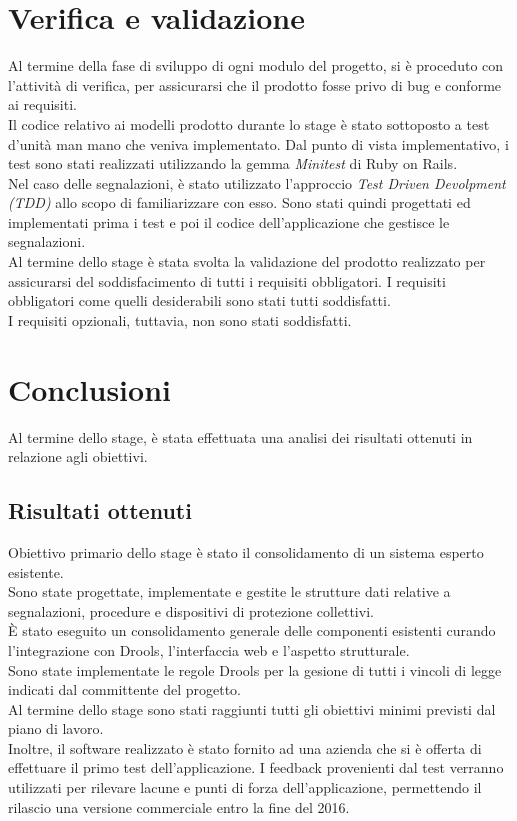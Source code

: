\newpage
\section{Verifica e validazione}
	Al termine della fase di sviluppo di ogni modulo del progetto, si è proceduto con l'attività di verifica, per assicurarsi che il prodotto fosse privo di bug e conforme ai requisiti.\\
	Il codice relativo ai modelli prodotto durante lo stage è stato sottoposto a test d'unità man mano che veniva implementato. Dal punto di vista implementativo, i test sono stati realizzati utilizzando la gemma \textit{Minitest} di Ruby on Rails.\\
	Nel caso delle segnalazioni, è stato utilizzato l'approccio \textit{Test Driven Devolpment (TDD)} allo scopo di familiarizzare con esso. Sono stati quindi progettati ed implementati prima i test e poi il codice dell'applicazione che gestisce le segnalazioni.\\
	Al termine dello stage è stata svolta la validazione del prodotto realizzato per assicurarsi del soddisfacimento di tutti i requisiti obbligatori. I requisiti obbligatori come quelli desiderabili sono stati tutti soddisfatti.\\
	I requisiti opzionali, tuttavia,  non sono stati soddisfatti. 
	
	
	
\newpage
\section{Conclusioni}

	Al termine dello stage, è stata effettuata una analisi dei risultati ottenuti in relazione agli obiettivi.
	
	\subsection{Risultati ottenuti}

		Obiettivo primario dello stage è stato il consolidamento di un sistema esperto esistente. \\
		Sono state progettate, implementate e gestite le strutture dati relative a segnalazioni, procedure e dispositivi di protezione collettivi. \\
		È stato eseguito un consolidamento generale delle componenti esistenti curando l'integrazione con Drools, l'interfaccia web e l'aspetto strutturale.\\
		Sono state implementate le regole Drools per la gesione di tutti i vincoli di legge indicati dal committente del progetto.\\
		Al termine dello stage sono stati raggiunti tutti gli obiettivi minimi previsti dal piano di lavoro.\\
		Inoltre, il software realizzato è stato fornito ad una azienda che si è offerta di effettuare il primo test dell'applicazione. I feedback provenienti dal test verranno utilizzati per rilevare lacune e punti di forza dell'applicazione, permettendo il rilascio una versione commerciale entro la fine del 2016.

